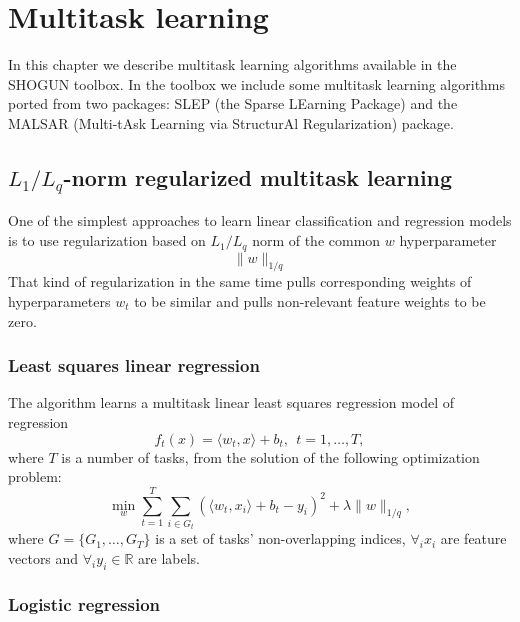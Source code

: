 %

\chapter{Multitask learning}

In this chapter we describe multitask learning algorithms available in the SHOGUN toolbox. 
In the toolbox we include some multitask learning algorithms ported from two packages: SLEP 
(the Sparse LEarning Package) and the MALSAR (Multi-tAsk Learning via StructurAl 
Regularization) package.

\section{$L_1/L_q$-norm regularized multitask learning}

One of the simplest approaches to learn linear classification and regression models is to
use regularization based on $L_1/L_q$ norm of the common $w$ hyperparameter
$$
\| w \|_{1/q}
$$ 
That kind of regularization in the same time pulls corresponding weights 
of hyperparameters $w_t$ to be similar and pulls non-relevant feature weights
to be zero.

\subsection{Least squares linear regression}

The algorithm learns a multitask linear least squares regression model of regression 
$$
f_t(x) = \langle w_t,x \rangle + b_t, ~~ t = 1, \dots, T,
$$
where $T$ is a number of tasks, from the solution of the following optimization problem:
$$
\min_w \sum_{t=1}^{T} \sum_{i \in G_t} \left(\langle w_t,x_i \rangle + b_t - y_i\right)^2
+ \lambda \| w \|_{1/q},
$$
where $G = \{ G_1, \dots, G_T \}$ is a set of tasks' non-overlapping indices, $\forall_i x_i$ are feature 
vectors and $\forall_i y_i \in \mathbb{R}$ are labels.

\subsection{Logistic regression}

